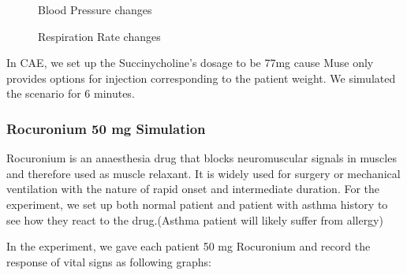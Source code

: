 \documentclass[a4paper]{article}
\begin{document}
\begin{figure}[!htb]\centering
   \begin{minipage}{0.49\textwidth}
     \caption{Blood Pressure changes}
     \label{fig:given 5 mg Succinylcholine}
     
   \end{minipage}
   \begin {minipage}{0.49\textwidth}
     \caption{Respiration Rate changes}
     \label{fig:given 5 mg Succinylcholine}
   \end{minipage}
\end{figure}

In CAE, we set up the Succinycholine's dosage to be 77mg cause Muse only provides options for injection corresponding to the patient weight. We simulated the scenario for 6 minutes. 

\subsubsection{Rocuronium 50 mg Simulation}

Rocuronium is an anaesthesia drug that blocks neuromuscular signals in muscles and therefore used as muscle relaxant. It is widely used for surgery or mechanical ventilation with the nature of rapid onset and intermediate duration. For the experiment, we set up both normal patient and patient with asthma history to see how they react to the drug.(Asthma patient will likely suffer from allergy)

In the experiment, we gave each patient 50 mg Rocuronium and record the response of vital signs as following graphs:
\end{document}
